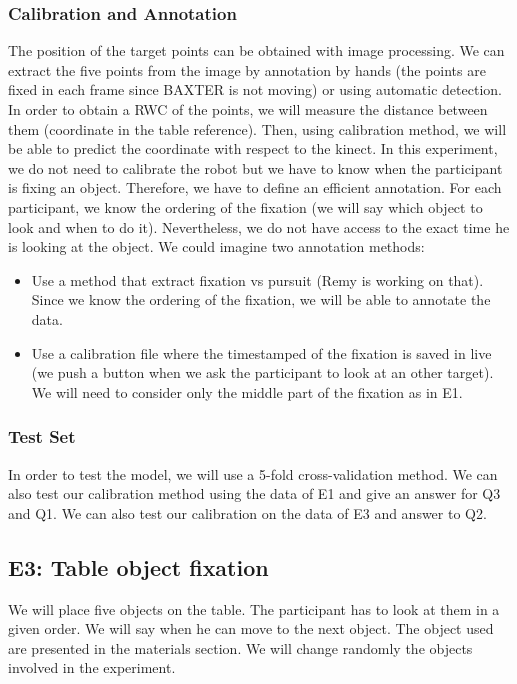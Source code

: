 \documentclass[11pt,a4paper]{article}
\begin{document}
\subsubsection{Calibration and Annotation}
The position of the target points can be obtained with image processing. We can extract the five points from the image by annotation by hands (the points are fixed in each frame since BAXTER is not moving) or using automatic detection. In order to obtain a RWC of the points, we will measure the distance between them (coordinate in the table reference). Then, using calibration method, we will be able to predict the coordinate with respect to the kinect. In this experiment, we do not need to calibrate the robot but we have to know when the participant is fixing an object. Therefore, we have to define an efficient annotation. For each participant, we know the ordering of the fixation (we will say which object to look and when to do it). Nevertheless, we do not have access to the exact time he is looking at the object. We could imagine two annotation methods:
\begin{itemize}
\item Use a method that extract fixation vs pursuit (Remy is working on that). Since we know the ordering of the fixation, we will be able to annotate the data.
\item Use a calibration file where the timestamped of the fixation is saved in live (we push a button when we ask the participant to look at an other target). We will need to consider only the middle part of the fixation as in E1.
\end{itemize}

\subsubsection{Test Set}
In order to test the model, we will use a 5-fold cross-validation method. We can also test our calibration method using the data of E1 and give an answer for Q3 and Q1. We can also test our calibration on the data of E3 and answer to Q2. 

\subsection{E3: Table object fixation}
We will place five objects on the table. The participant has to look at them in a given order. We will say when he can move to the next object. The object used are presented in the materials section. We will change randomly the objects involved in the experiment.
\end{document}
